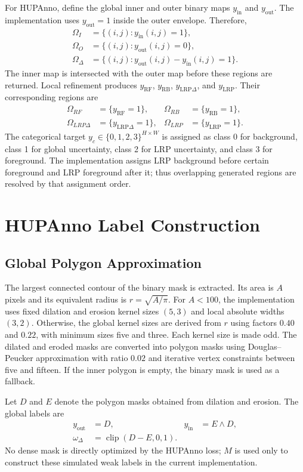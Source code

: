 \documentclass[journal]{IEEEtran}
\begin{document}
For HUPAnno, define the global inner and outer binary maps $y_{\mathrm{in}}$ and $y_{\mathrm{out}}$. The implementation uses $y_{\mathrm{out}}=1$ inside the outer envelope. Therefore,
\begin{align}
\Omega_I &= \{(i,j):y_{\mathrm{in}}(i,j)=1\},\\
\Omega_O &= \{(i,j):y_{\mathrm{out}}(i,j)=0\},\\
\Omega_\Delta &= \{(i,j):y_{\mathrm{out}}(i,j)-y_{\mathrm{in}}(i,j)=1\}.
\end{align}
The inner map is intersected with the outer map before these regions are returned. Local refinement produces $y_{\mathrm{RF}}$, $y_{\mathrm{RB}}$, $y_{\mathrm{LRP}\Delta}$, and $y_{\mathrm{LRP}}$. Their corresponding regions are
\begin{align}
\Omega_{RF}&=\{y_{\mathrm{RF}}=1\}, &
\Omega_{RB}&=\{y_{\mathrm{RB}}=1\},\\
\Omega_{LRP\Delta}&=\{y_{\mathrm{LRP}\Delta}=1\}, &
\Omega_{LRP}&=\{y_{\mathrm{LRP}}=1\}.
\end{align}
The categorical target $y_c\in\{0,1,2,3\}^{H\times W}$ is assigned as class 0 for background, class 1 for global uncertainty, class 2 for LRP uncertainty, and class 3 for foreground. The implementation assigns LRP background before certain foreground and LRP foreground after it; thus overlapping generated regions are resolved by that assignment order.

\section{HUPAnno Label Construction}
\subsection{Global Polygon Approximation}
The largest connected contour of the binary mask is extracted. Its area is $A$ pixels and its equivalent radius is $r=\sqrt{A/\pi}$. For $A<100$, the implementation uses fixed dilation and erosion kernel sizes $(5,3)$ and local absolute widths $(3,2)$. Otherwise, the global kernel sizes are derived from $r$ using factors $0.40$ and $0.22$, with minimum sizes five and three. Each kernel size is made odd. The dilated and eroded masks are converted into polygon masks using Douglas--Peucker approximation with ratio $0.02$ and iterative vertex constraints between five and fifteen. If the inner polygon is empty, the binary mask is used as a fallback.

Let $D$ and $E$ denote the polygon masks obtained from dilation and erosion. The global labels are
\begin{align}
 y_{\mathrm{out}}&=D, & y_{\mathrm{in}}&=E\land D,\\
 \omega_\Delta&=\operatorname{clip}(D-E,0,1).
\end{align}
No dense mask is directly optimized by the HUPAnno loss; $M$ is used only to construct these simulated weak labels in the current implementation.
\end{document}

